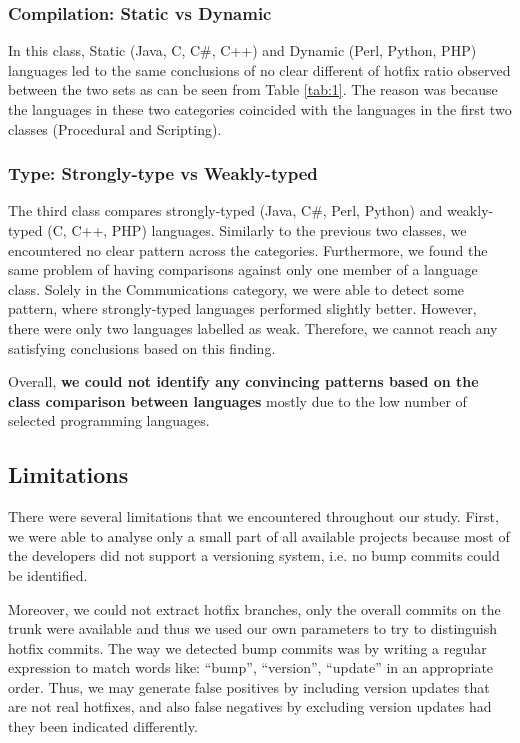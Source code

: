\documentclass{sig-alternate}
\begin{document}
\subsubsection*{Compilation: Static vs Dynamic}
In this class, Static (Java, C, C\#, C++) and Dynamic (Perl, Python, PHP) languages led to the same conclusions of no clear different of hotfix ratio observed between the two sets as can be seen from Table \ref{tab:1}. The reason was because the languages in these two categories coincided with the languages in the first two classes (Procedural and Scripting).

\subsubsection*{Type: Strongly-type vs Weakly-typed}
The third class compares strongly-typed (Java, C\#, Perl, Python) and weakly-typed (C, C++, PHP) languages. Similarly to the previous two classes, we encountered no clear pattern across the categories. Furthermore, we found the same problem of having comparisons against only one member of a language class. Solely in the Communications category, we were able to detect some pattern, where strongly-typed languages performed slightly better. However, there were only two languages labelled as weak. Therefore, we cannot reach any satisfying conclusions based on this finding.

Overall, \textbf{we could not identify any convincing patterns based on the class comparison between languages} mostly due to the low number of selected programming languages.

\subsection{Limitations}
There were several limitations that we encountered throughout our study. First, we were able to analyse only a small part of all available projects because most of the developers did not support a versioning system, i.e. no bump commits could be identified.

Moreover, we could not extract hotfix branches, only the overall commits on the trunk were available and thus we used our own parameters to try to distinguish hotfix commits. The way we detected bump commits was by writing a regular expression to match words like:  ``bump'', ``version'', ``update'' in an appropriate order. Thus, we may generate false positives by including version updates that are not real hotfixes, and also false negatives by excluding version updates had they been indicated differently.
\end{document}
